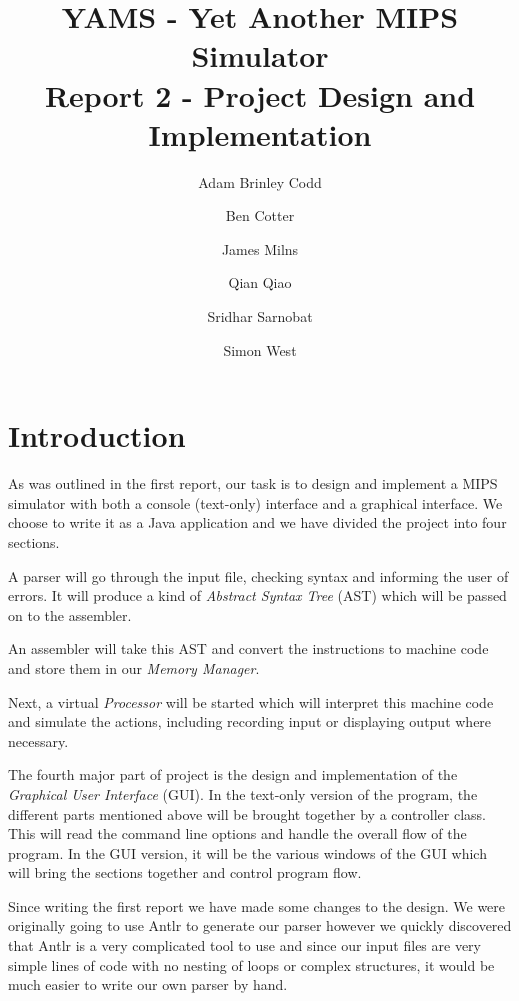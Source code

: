 \documentclass[12pt]{report}
\begin{document}
\title{YAMS - Yet Another MIPS Simulator
\\Report 2 - Project Design and Implementation}
\author{Adam Brinley Codd
\and
Ben Cotter
\and
James Milns
\and
Qian Qiao
\and
Sridhar Sarnobat
\and
Simon West}
\maketitle



\tableofcontents
\thispagestyle{empty}



\chapter{Introduction}

As was outlined in the first report, our task is to design and implement a MIPS simulator with both a console (text-only) interface and a graphical interface.  We choose to write it as a Java application and we have divided the project into four sections.

A parser will go through the input file, checking syntax and informing the user of errors.  It will produce a kind of \emph{Abstract Syntax Tree} (AST) which will be passed on to the assembler.

An assembler will take this AST and convert the instructions to machine code and store them in our \emph{Memory Manager}.

Next, a virtual \emph{Processor} will be started which will interpret this machine code and simulate the actions, including recording input or displaying output where necessary.

The fourth major part of project is the design and implementation of the \emph{Graphical User Interface} (GUI).  In the text-only version of the program, the different parts mentioned above will be brought together by a controller class.  This will read the command line options and handle the overall flow of the program.  In the GUI version, it will be the various windows of the GUI which will bring the sections together and control program flow.

Since writing the first report we have made some changes to the design.  We were originally going to use Antlr to generate our parser however we quickly discovered that Antlr is a very complicated tool to use and since our input files are very simple lines of code with no nesting of loops or complex structures, it would be much easier to write our own parser by hand.
\end{document}
